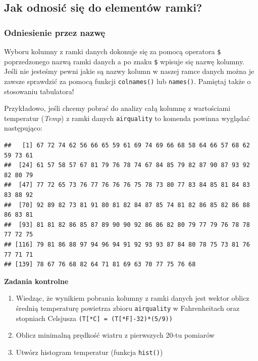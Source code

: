 \documentclass[]{book}
\newenvironment{Shaded}{\begin{snugshade}}{\end{snugshade}}
\newcommand{\OperatorTok}[1]{\textcolor[rgb]{0.81,0.36,0.00}{\textbf{#1}}}
\newcommand{\NormalTok}[1]{#1}
\theoremstyle{definition}
\theoremstyle{definition}
\theoremstyle{definition}
\theoremstyle{remark}
\begin{document}
\subsection{Jak odnosić się do elementów
ramki?}\label{jak-odnosic-sie-do-elementow-ramki}

\subsubsection{Odniesienie przez nazwę}\label{odniesienie-przez-nazwe}

Wyboru kolumny z ramki danych dokonuje się za pomocą operatora
\texttt{\$} poprzedzonego nazwą ramki danych a po znaku \texttt{\$}
wpisuje się nazwę kolumny. Jeśli nie jesteśmy pewni jakie są nazwy
kolumn w naszej ramce danych można je zawsze sprawdzić za pomocą funkcji
\texttt{colnames()} lub \texttt{names()}. Pamiętaj także o stosowaniu
tabulatora!

Przykładowo, jeśli chcemy pobrać do analizy całą kolumnę z wartościami
temperatur (\emph{Temp}) z ramki danych \texttt{airquality} to komenda
powinna wyglądać następująco:

\begin{Shaded}
\end{Shaded}

\begin{verbatim}
##   [1] 67 72 74 62 56 66 65 59 61 69 74 69 66 68 58 64 66 57 68 62 59 73 61
##  [24] 61 57 58 57 67 81 79 76 78 74 67 84 85 79 82 87 90 87 93 92 82 80 79
##  [47] 77 72 65 73 76 77 76 76 76 75 78 73 80 77 83 84 85 81 84 83 83 88 92
##  [70] 92 89 82 73 81 91 80 81 82 84 87 85 74 81 82 86 85 82 86 88 86 83 81
##  [93] 81 81 82 86 85 87 89 90 90 92 86 86 82 80 79 77 79 76 78 78 77 72 75
## [116] 79 81 86 88 97 94 96 94 91 92 93 93 87 84 80 78 75 73 81 76 77 71 71
## [139] 78 67 76 68 82 64 71 81 69 63 70 77 75 76 68
\end{verbatim}

\textbf{Zadania kontrolne}

\begin{enumerate}
\def\labelenumi{\arabic{enumi}.}
\item
  Wiedząc, że wynikiem pobrania kolumny z ramki danych jest wektor
  oblicz średnią temperaturę powietrza zbioru \texttt{airquality} w
  Fahrenheitach oraz stopniach Celsjusza
  \texttt{(T{[}*C{]}\ =\ (T{[}*F{]}-32)*(5/9))}
\item
  Oblicz minimalną prędkość wiatru z pierwszych 20-tu pomiarów
\item
  Utwórz histogram temperatur (funkcja \texttt{hist()})
\end{enumerate}
\end{document}
